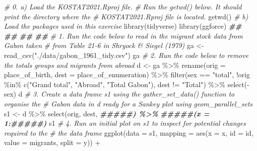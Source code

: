 \documentclass[
]{book}
\newenvironment{Shaded}{\begin{snugshade}}{\end{snugshade}}
\newcommand{\AttributeTok}[1]{\textcolor[rgb]{0.77,0.63,0.00}{#1}}
\newcommand{\CommentTok}[1]{\textcolor[rgb]{0.56,0.35,0.01}{\textit{#1}}}
\newcommand{\DocumentationTok}[1]{\textcolor[rgb]{0.56,0.35,0.01}{\textbf{\textit{#1}}}}
\newcommand{\FunctionTok}[1]{\textcolor[rgb]{0.00,0.00,0.00}{#1}}
\newcommand{\NormalTok}[1]{#1}
\newcommand{\OtherTok}[1]{\textcolor[rgb]{0.56,0.35,0.01}{#1}}
\newcommand{\SpecialCharTok}[1]{\textcolor[rgb]{0.00,0.00,0.00}{#1}}
\newcommand{\StringTok}[1]{\textcolor[rgb]{0.31,0.60,0.02}{#1}}
\begin{document}
\begin{Shaded}
\begin{Highlighting}[]
\CommentTok{\# 0.  a) Load the KOSTAT2021.Rproj file. }
\CommentTok{\#     Run the getwd() below. It should print the directory where the }
\CommentTok{\#     KOSTAT2021.Rproj file is located.}
\FunctionTok{getwd}\NormalTok{()}
\CommentTok{\#     b) Load the packages used in this exercise}
\FunctionTok{library}\NormalTok{(tidyverse)}
\FunctionTok{library}\NormalTok{(ggforce)}
\DocumentationTok{\#\#}
\DocumentationTok{\#\#}
\DocumentationTok{\#\#}
\DocumentationTok{\#\#}
\CommentTok{\# 1. Run the code below to read in the migrant stock data from Gabon taken}
\CommentTok{\#    from Table 21{-}6 in Shryock \& Siegel (1979)}
\NormalTok{ga }\OtherTok{\textless{}{-}} \FunctionTok{read\_csv}\NormalTok{(}\StringTok{"./data/gabon\_1961\_tidy.csv"}\NormalTok{) }
\NormalTok{ga}
\CommentTok{\# 2. Run the code below to remove the totals groups and migrants from abroad}
\NormalTok{d }\OtherTok{\textless{}{-}}\NormalTok{ ga }\SpecialCharTok{\%\textgreater{}\%}
  \FunctionTok{rename}\NormalTok{(}\AttributeTok{orig =}\NormalTok{ place\_of\_birth, }
         \AttributeTok{dest =}\NormalTok{ place\_of\_enumeration) }\SpecialCharTok{\%\textgreater{}\%}
  \FunctionTok{filter}\NormalTok{(sex }\SpecialCharTok{==} \StringTok{"total"}\NormalTok{, }
         \SpecialCharTok{!}\NormalTok{orig }\SpecialCharTok{\%in\%} \FunctionTok{c}\NormalTok{(}\StringTok{"Grand total"}\NormalTok{, }\StringTok{"Abroad"}\NormalTok{, }\StringTok{"Total Gabon"}\NormalTok{), }
\NormalTok{         dest }\SpecialCharTok{!=} \StringTok{"Total"}\NormalTok{) }\SpecialCharTok{\%\textgreater{}\%}
  \FunctionTok{select}\NormalTok{(}\SpecialCharTok{{-}}\NormalTok{sex)}
\NormalTok{d}
\CommentTok{\# 3. Create a data frame s1 using the gather\_set\_data() function to organise the}
\CommentTok{\#    Gabon data in d ready for a Sankey plot using geom\_parallel\_sets}
\NormalTok{s1 }\OtherTok{\textless{}{-}}\NormalTok{ d }\SpecialCharTok{\%\textgreater{}\%}
  \FunctionTok{select}\NormalTok{(orig, dest, }\DocumentationTok{\#\#\#\#\#) \%\textgreater{}\%}
  \DocumentationTok{\#\#\#\#\#(x = 1:\#\#\#\#\#)}
\NormalTok{s1}
\CommentTok{\# 4. Run an initial plot on s1 to inspect for potential changes required to the}
\CommentTok{\#    the data frame}
\FunctionTok{ggplot}\NormalTok{(}\AttributeTok{data =}\NormalTok{ s1,}
       \AttributeTok{mapping =} \FunctionTok{aes}\NormalTok{(}\AttributeTok{x =}\NormalTok{ x, }\AttributeTok{id =}\NormalTok{ id, }\AttributeTok{value =}\NormalTok{ migrants, }\AttributeTok{split =}\NormalTok{ y)) }\SpecialCharTok{+}

\end{Highlighting}
\end{Shaded}
\end{document}
